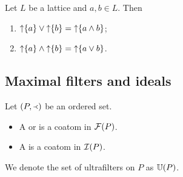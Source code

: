 \begin{lemma}
Let $L$ be a lattice and $a,b\in L$. Then
\begin{enumerate}
\item $\operatorname{\uparrow}\{a\} \vee \operatorname{\uparrow}\{b\} = \operatorname{\uparrow}\{a\wedge b\}$;
\item $\operatorname{\uparrow}\{a\} \wedge \operatorname{\uparrow}\{b\} = \operatorname{\uparrow}\{a\vee b\}$.
\end{enumerate}
\end{lemma}

\subsection{Maximal filters and ideals}
\begin{definition}
Let $\sSet{P,\Yleft}$ be an ordered set.
\begin{itemize}
\item A  or  is a coatom in $\operatorname{\mathcal{F}}(P)$.
\item A  is a coatom in $\operatorname{\mathcal{I}}(P)$.
\end{itemize}
We denote the set of ultrafilters on $P$ as $\operatorname{\mathbb{U}}(P)$.
\end{definition}

